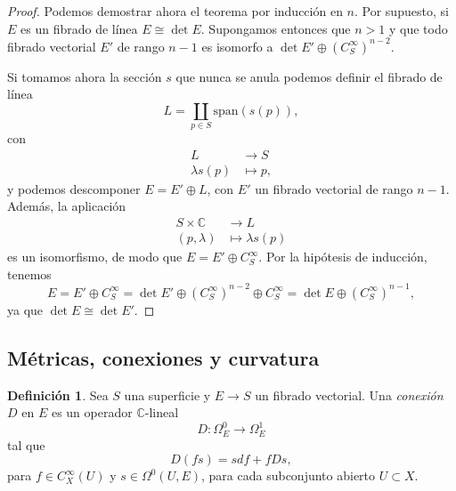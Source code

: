 \documentclass[12pt,a4paper]{article}
\theoremstyle{definition} \newtheorem{defn}[thm]{Definición}
\theoremstyle{definition} \newtheorem{ejemplo}[thm]{Ejemplo}
\theoremstyle{definition} \newtheorem{ejercicio}[thm]{Ejercicio}
\def\CC{\mathbb{C}}
\begin{document}
	      \begin{proof}
		Podemos demostrar ahora el teorema por inducción en $n$. Por supuesto, si $E$ es un fibrado de línea $E\cong \det E$. Supongamos entonces que $n>1$ y que todo fibrado vectorial $E'$ de rango $n-1$ es isomorfo a $\det E' \oplus (C^\infty_S)^{n-2}$.

		Si tomamos ahora la sección $s$ que nunca se anula podemos definir el fibrado de línea
		\begin{equation*}
		  L = \coprod_{p \in S} \mathrm{span}(s(p)),
		\end{equation*}
		con
		\begin{align*}
		   L&\longrightarrow S\\ 
		    \lambda s(p) &\longmapsto p,
		  \end{align*}
y podemos descomponer $E=E'\oplus L$, con $E'$ un fibrado vectorial de rango $n-1$. Además, la aplicación
\begin{align*}
 S\times \CC &\longrightarrow L\\ 
    (p,\lambda) &\longmapsto \lambda s(p) 
  \end{align*}
  es un isomorfismo, de modo que $E=E' \oplus C^\infty_S$. Por la hipótesis de inducción, tenemos
  \begin{equation*}
    E=E' \oplus C^\infty_S = \det E' \oplus (C^\infty_S)^{n-2} \oplus C^\infty_S = \det E \oplus (C^\infty_S)^{n-1},
  \end{equation*}
  ya que $\det E \cong \det E'$.
	      \end{proof}

		

	  \subsection{Métricas, conexiones y curvatura}
	  \begin{defn}
	    Sea $S$ una superficie y $E\rightarrow S$ un fibrado vectorial. Una \emph{conexión} $D$ en $E$ es un operador $\CC$-lineal
	    \begin{equation*}
	      D:\Omega^0_E \longrightarrow \Omega^1_E
	    \end{equation*}
	    tal que
	    \begin{equation*}
	      D(fs) = sdf + f Ds,
	    \end{equation*}
	    para $f\in C^\infty_X(U)$ y $s\in \Omega^0(U,E)$, para cada subconjunto abierto $U\subset X$.
	  \end{defn}
\end{document}
